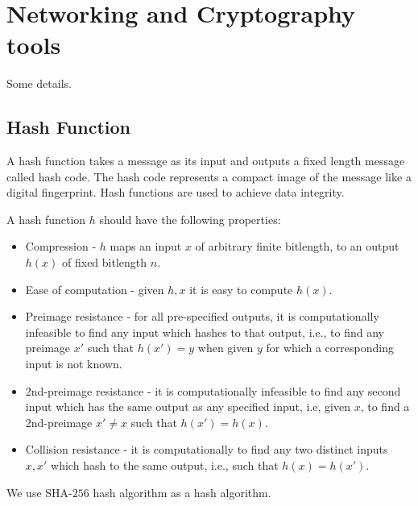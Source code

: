 \chapter{Networking and Cryptography tools} %
\label{cha:Networking and Cryptography tools}

Some details.

\section{Hash Function}
	A hash function takes a message as its input and outputs a fixed length message called hash code.
	The hash code represents a compact image of the message like a digital fingerprint.
	Hash functions are used to achieve data integrity.

	A hash function $h$ should have the following properties:
	\begin{itemize}
		\item Compression - $h$ maps an input $x$ of arbitrary finite bitlength, to an output $h(x)$ of fixed bitlength $n$.
		\item Ease of computation - given $h,x$ it is easy to compute $h(x)$.
		\item Preimage resistance - for all pre-specified outputs, it is computationally infeasible to find any input which hashes to that output, i.e., to find any preimage $x'$ such that $h(x') = y$ when given $y$ for which a corresponding input is not known.
		\item 2nd-preimage resistance - it is computationally infeasible to find any second input which has the same output as any specified input, i.e, given $x$, to find a 2nd-preimage $x' \neq x$ such that $h(x') = h(x)$.
		\item Collision resistance - it is computationally to find any two distinct inputs $x,x'$ which hash to the same output, i.e., such that $h(x) = h(x')$.
	\end{itemize} 

	We use SHA-$256$ hash algorithm as a hash algorithm.

